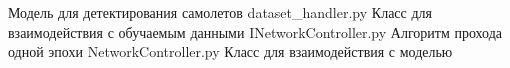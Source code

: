 \begin{appendices}
	{Модель для детектирования самолетов} %
	{dataset_handler.py} %
	{Класс для взаимодействия с обучаемым данными} %
	{INetworkController.py} %
	{Алгоритм прохода одной эпохи} %
	{NetworkController.py} %
	{Класс для взаимодействия с моделью} %

\end{appendices}